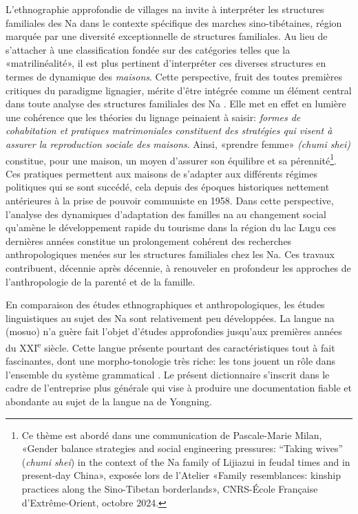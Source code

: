 L'ethnographie approfondie de villages na \parencite{milan_na_2016,milan_tourisme_2019} invite à interpréter les structures familiales des Na dans le contexte spécifique des marches sino-tibétaines, région marquée par une diversité exceptionnelle de structures familiales.
Au lieu de s’attacher à une classification fondée sur des catégories telles que la «matrilinéalité», il est plus pertinent d’interpréter ces diverses structures en termes de dynamique des \emph{maisons}. Cette perspective, fruit des toutes premières critiques du paradigme lignagier, mérite d'être intégrée comme un élément central dans toute analyse des structures familiales des Na \parencite{zhou_zigong_2003,hosana_2006}. Elle met en effet en lumière une cohérence que les théories du lignage peinaient à saisir: \emph{formes de cohabitation et pratiques matrimoniales constituent des stratégies qui visent à assurer la reproduction sociale des maisons}. Ainsi, «prendre femme» \emph{(chumi shei)} constitue, pour une maison, un moyen d’assurer son équilibre et sa pérennité\footnote{Ce thème est abordé dans une communication de Pascale-Marie Milan, «Gender balance strategies and social engineering pressures: “Taking wives” (\emph{chumi shei}) in the context of the Na family of Lijiazui in feudal times and in present-day China», exposée lors de l'Atelier «Family resemblances: kinship practices along the Sino-Tibetan borderlands», CNRS-École Française d'Extrême-Orient, octobre 2024.}. Ces pratiques permettent aux maisons de s'adapter aux différents régimes politiques qui se sont succédé, cela depuis des époques historiques nettement antérieures à la prise de pouvoir communiste en 1958. Dans cette perspective, l'analyse des dynamiques d'adaptation des familles na au changement social qu'amène le développement rapide du tourisme dans la région du lac Lugu ces dernières années \parencite{walsh_living_2001,mattison2010,milan_tourisme_2019} constitue un prolongement cohérent des recherches anthropologiques menées sur les structures familiales chez les Na. Ces travaux contribuent, décennie après décennie, à renouveler en profondeur les approches de l'anthropologie de la parenté et de la famille.

En comparaison des études ethnographiques et anthropologiques, les études linguistiques au sujet des Na sont relativement peu développées. La langue na (mosuo) n'a guère fait l'objet d'études approfondies jusqu'aux premières années du XXI\textsuperscript{e} siècle. Cette langue présente pourtant des caractéristiques tout à fait fascinantes, dont une morpho-tonologie très riche: les tons jouent un rôle dans l'ensemble du système grammatical \parencite{michaud2017}. Le présent dictionnaire s'inscrit dans le cadre de l'entreprise plus générale qui vise à produire une documentation fiable et abondante au sujet de la langue na de Yongning.

